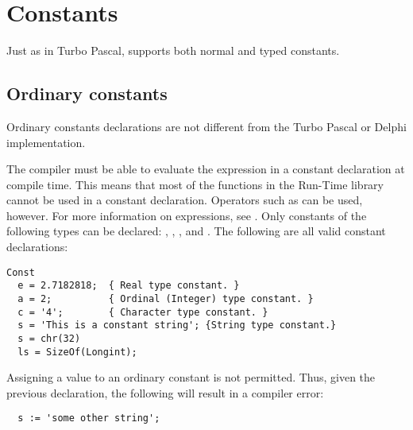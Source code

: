 \chapter{Constants}
Just as in Turbo Pascal, \fpc supports both normal and typed constants.

\section{Ordinary constants}
Ordinary constants declarations are not different from the Turbo Pascal or
Delphi implementation.

The compiler must be able to evaluate the expression in a constant
declaration at compile time.  This means that most of the functions
in the Run-Time library cannot be used in a constant declaration.
Operators such as  can be used, however. For more 
information on expressions, see .
Only constants of the following types can be declared: ,
, , and .
The following are all valid constant declarations:
\begin{verbatim}
Const
  e = 2.7182818;  { Real type constant. }
  a = 2;          { Ordinal (Integer) type constant. }
  c = '4';        { Character type constant. }
  s = 'This is a constant string'; {String type constant.}
  s = chr(32)
  ls = SizeOf(Longint);
\end{verbatim}
Assigning a value to an ordinary constant is not permitted.
Thus, given the previous declaration, the following will result
in a compiler error:
\begin{verbatim}
  s := 'some other string';
\end{verbatim}


